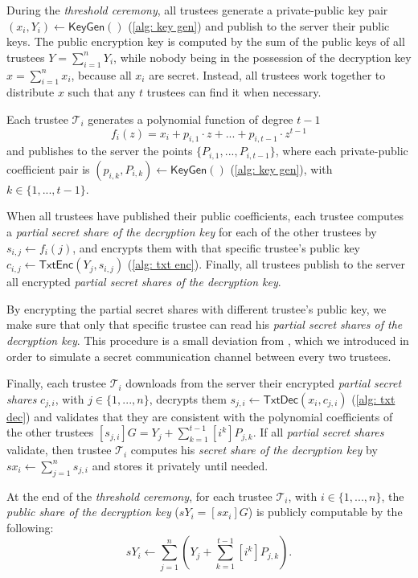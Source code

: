 During the \textit{threshold ceremony}, all trustees generate a private-public key pair $(x_i, Y_i) \gets \mathsf{KeyGen}()$ (\cref{alg: key gen}) and publish to the server their public keys. The public encryption key is computed by the sum of the public keys of all trustees $Y = \sum_{i=1}^n Y_i$, while nobody being in the possession of the decryption key $x = \sum_{i=1}^n x_i$, because all $x_i$ are secret. Instead, all trustees work together to distribute $x$ such that any $t$ trustees can find it when necessary. 

Each trustee $\mathcal{T}_i$ generates a polynomial function of degree $t-1$
\[
f_i(z) = x_i + p_{i, 1} \cdot z + ... + p_{i, t-1} \cdot z^{t-1}
\]
and publishes to the server the points $\{ P_{i, 1}, ..., P_{i, t-1} \}$, where each private-public coefficient pair is $(p_{i, k}, P_{i, k}) \gets \mathsf{KeyGen}()$ (\cref{alg: key gen}), with $k \in \{ 1, ..., t-1 \}$.

When all trustees have published their public coefficients, each trustee computes a \textit{partial secret share of the decryption key} for each of the other trustees by $s_{i, j} \gets f_i(j)$, and encrypts them with that specific trustee's public key $c_{i, j} \gets \mathsf{TxtEnc}(Y_j, s_{i, j})$ (\cref{alg: txt enc}). Finally, all trustees publish to the server all encrypted \textit{partial secret shares of the decryption key}.

By encrypting the partial secret shares with different trustee's public key, we make sure that only that specific trustee can read his \textit{partial secret shares of the decryption key}. This procedure is a small deviation from \cite{Pedersen91}, which we introduced in order to simulate a secret communication channel between every two trustees.

Finally, each trustee $\mathcal{T}_i$ downloads from the server their encrypted \textit{partial secret shares} $c_{j, i}$, with $j \in \{ 1, ..., n \}$, decrypts them $s_{j, i} \gets \mathsf{TxtDec}(x_i, c_{j, i})$ (\cref{alg: txt dec}) and validates that they are consistent with the polynomial coefficients of the other trustees $[s_{j, i}]G = Y_j + \sum_{k=1}^{t-1} [i^k] P_{j, k}$. If all \textit{partial secret shares} validate, then trustee $\mathcal{T}_i$ computes his \textit{secret share of the decryption key} by $sx_i \gets \sum_{j=1}^n s_{j, i}$ and stores it privately until needed.

At the end of the \textit{threshold ceremony}, for each trustee $\mathcal{T}_i$, with $i \in \{ 1, ..., n \}$, the \textit{public share of the decryption key} ($sY_i = [sx_i]G$) is publicly computable by the following:
\[
sY_i \gets \sum\limits_{j=1}^{n} (Y_j + \sum\limits_{k=1}^{t-1} [i^k]P_{j, k}).
\]

